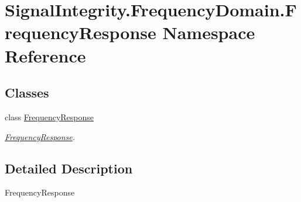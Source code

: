 \hypertarget{namespaceSignalIntegrity_1_1FrequencyDomain_1_1FrequencyResponse}{}\section{Signal\+Integrity.\+Frequency\+Domain.\+Frequency\+Response Namespace Reference}
\label{namespaceSignalIntegrity_1_1FrequencyDomain_1_1FrequencyResponse}
\subsection*{Classes}
\begin{DoxyCompactItemize}
\item 
class \hyperlink{classSignalIntegrity_1_1FrequencyDomain_1_1FrequencyResponse_1_1FrequencyResponse}{Frequency\+Response}
\begin{DoxyCompactList}\small\item\em \hyperlink{classSignalIntegrity_1_1FrequencyDomain_1_1FrequencyResponse_1_1FrequencyResponse}{Frequency\+Response}. \end{DoxyCompactList}\end{DoxyCompactItemize}


\subsection{Detailed Description}
\begin{DoxyVerb}FrequencyResponse\end{DoxyVerb}
 